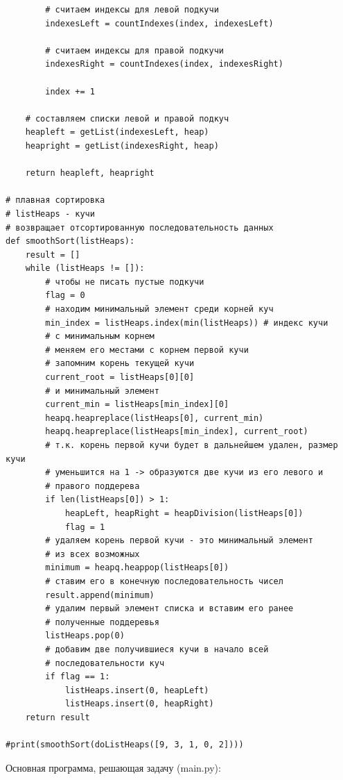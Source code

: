 \documentclass[12pt,a4paper]{scrartcl}
\begin{document}
\begin{verbatim}
        # считаем индексы для левой подкучи
        indexesLeft = countIndexes(index, indexesLeft)

        # считаем индексы для правой подкучи
        indexesRight = countIndexes(index, indexesRight)

        index += 1

    # составляем списки левой и правой подкуч
    heapleft = getList(indexesLeft, heap)
    heapright = getList(indexesRight, heap)

    return heapleft, heapright

# плавная сортировка
# listHeaps - кучи
# возвращает отсортированную последовательность данных
def smoothSort(listHeaps):
    result = []
    while (listHeaps != []):
        # чтобы не писать пустые подкучи
        flag = 0
        # находим минимальный элемент среди корней куч
        min_index = listHeaps.index(min(listHeaps)) # индекс кучи
        # с минимальным корнем
        # меняем его местами с корнем первой кучи
        # запомним корень текущей кучи
        current_root = listHeaps[0][0]
        # и минимальный элемент
        current_min = listHeaps[min_index][0]
        heapq.heapreplace(listHeaps[0], current_min)
        heapq.heapreplace(listHeaps[min_index], current_root)
        # т.к. корень первой кучи будет в дальнейшем удален, размер кучи
        # уменьшится на 1 -> образуются две кучи из его левого и 
        # правого поддерева
        if len(listHeaps[0]) > 1:
            heapLeft, heapRight = heapDivision(listHeaps[0])
            flag = 1
        # удаляем корень первой кучи - это минимальный элемент 
        # из всех возможных
        minimum = heapq.heappop(listHeaps[0])
        # ставим его в конечную последовательность чисел
        result.append(minimum)
        # удалим первый элемент списка и вставим его ранее 
        # полученные поддеревья
        listHeaps.pop(0)
        # добавим две получившиеся кучи в начало всей 
        # последовательности куч
        if flag == 1:
            listHeaps.insert(0, heapLeft)
            listHeaps.insert(0, heapRight)
    return result

#print(smoothSort(doListHeaps([9, 3, 1, 0, 2])))
\end{verbatim}

Основная программа, решающая задачу (main.py):
\end{document}
